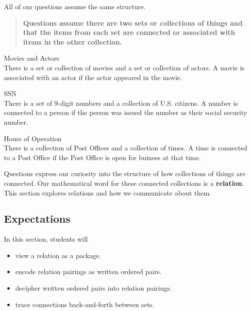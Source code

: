 \documentclass{ximera}
\begin{document}
All of our questions assume the same structure.  \\


\begin{quote} 
\textbf{\textcolor{green!50!black}{Questions assume there are two sets or collections of things and that the items from each set are connected or associated with items in the other collection.}} 
\end{quote}


\begin{example} Movies and Actors \\
There is a set or collection of movies and a set or collection of actors.  A movie is associated with an actor if the actor appeared in the movie.
\end{example}

\begin{example} SSN \\
There is a set of 9-digit numbers and a collection of U.S. citizens.  A number is connected to a person if the person was issued the number as their social security number.
\end{example}

\begin{example} Hours of Operation \\
There is a collection of Post Offices and a collection of times.  A time is connected to a Post Office if the Post Office is open for buiness at that time.
\end{example}




Questions express our curiosity into the structure of how collections of things are connected. Our mathematical word for these connected collections is a \textbf{\textcolor{blue!75!black}{relation}}. \\


This section explores relations and how we communicate about them. \\










\subsection{Expectations}

\begin{sectionOutcomes}
In this section, students will 

\begin{itemize}
\item view a relation as a package.
\item encode relation pairings as written ordered pairs.
\item decipher written ordered pairs into relation pairings.
\item trace connections back-and-forth between sets.
\end{itemize}
\end{sectionOutcomes}
\end{document}
